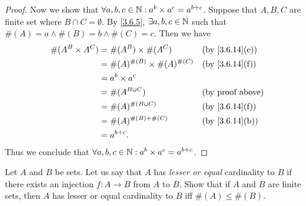 \begin{proof}
  Now we show that \(\forall a, b, c \in \mathbb{N} : a^b \times a^c = a^{b + c}\).
  Suppose that \(A, B, C\) are finite set where \(B \cap C = \emptyset\).
  By \cref{3.6.5}, \(\exists a, b, c \in \mathbb{N}\) such that \(\#(A) = a \land \#(B) = b \land \#(C) = c\).
  Then we have
  \begin{align*}
    \#(A^B \times A^C) & = \#(A^B) \times \#(A^C)             &  & \text{(by \cref{3.6.14}(e))} \\
                       & = \#(A)^{\#(B)} \times \#(A)^{\#(C)} &  & \text{(by \cref{3.6.14}(f))} \\
                       & = a^b \times a^c                                                       \\
                       & = \#(A^{B \cup C})                   &  & \text{(by proof above)}      \\
                       & = \#(A)^{\#(B \cup C)}               &  & \text{(by \cref{3.6.14}(f))} \\
                       & = \#(A)^{\#(B) + \#(C)}              &  & \text{(by \cref{3.6.14}(b))} \\
                       & = a^{b + c}.
  \end{align*}
  Thus we conclude that \(\forall a, b, c \in \mathbb{N} : a^b \times a^c = a^{b + c}\).
\end{proof}

\begin{ex}\label{ex:3.6.7}
  Let \(A\) and \(B\) be sets.
  Let us say that \(A\) has \emph{lesser or equal} cardinality to \(B\) if there exists an injection \(f : A \to B\) from \(A\) to \(B\).
  Show that if \(A\) and \(B\) are finite sets, then \(A\) has lesser or equal cardinality to \(B\) iff \(\#(A) \leq \#(B)\).
\end{ex}

